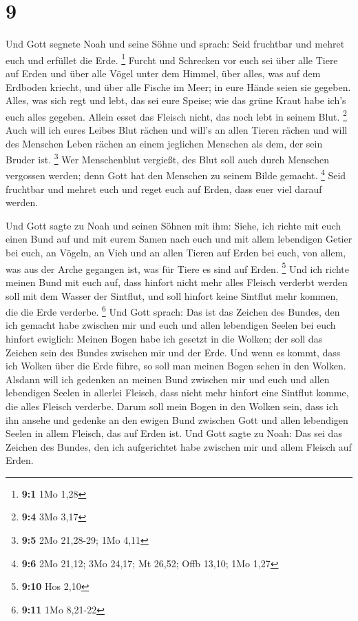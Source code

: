 \hypertarget{section-2}{%
\section{9}\label{section-2}}

 Und Gott segnete Noah und seine Söhne und sprach: Seid
fruchtbar und mehret euch und erfüllet die Erde. \footnote{\textbf{9:1}
  1Mo 1,28}  Furcht und Schrecken vor euch sei über alle
Tiere auf Erden und über alle Vögel unter dem Himmel, über alles, was
auf dem Erdboden kriecht, und über alle Fische im Meer; in eure Hände
seien sie gegeben.  Alles, was sich regt und lebt, das sei
eure Speise; wie das grüne Kraut habe ich's euch alles gegeben.
 Allein esset das Fleisch nicht, das noch lebt in seinem
Blut. \footnote{\textbf{9:4} 3Mo 3,17}  Auch will ich
eures Leibes Blut rächen und will's an allen Tieren rächen und will des
Menschen Leben rächen an einem jeglichen Menschen als dem, der sein
Bruder ist. \footnote{\textbf{9:5} 2Mo 21,28-29; 1Mo 4,11}
 Wer Menschenblut vergießt, des Blut soll auch durch
Menschen vergossen werden; denn Gott hat den Menschen zu seinem Bilde
gemacht. \footnote{\textbf{9:6} 2Mo 21,12; 3Mo 24,17; Mt 26,52; Offb
  13,10; 1Mo 1,27}  Seid fruchtbar und mehret euch und
reget euch auf Erden, dass euer viel darauf werden.

 Und Gott sagte zu Noah und seinen Söhnen mit ihm:
 Siehe, ich richte mit euch einen Bund auf und mit eurem
Samen nach euch  und mit allem lebendigen Getier bei
euch, an Vögeln, an Vieh und an allen Tieren auf Erden bei euch, von
allem, was aus der Arche gegangen ist, was für Tiere es sind auf Erden.
\footnote{\textbf{9:10} Hos 2,10}  Und ich richte meinen
Bund mit euch auf, dass hinfort nicht mehr alles Fleisch verderbt werden
soll mit dem Wasser der Sintflut, und soll hinfort keine Sintflut mehr
kommen, die die Erde verderbe. \footnote{\textbf{9:11} 1Mo 8,21-22}
 Und Gott sprach: Das ist das Zeichen des Bundes, den ich
gemacht habe zwischen mir und euch und allen lebendigen Seelen bei euch
hinfort ewiglich:  Meinen Bogen habe ich gesetzt in die
Wolken; der soll das Zeichen sein des Bundes zwischen mir und der Erde.
 Und wenn es kommt, dass ich Wolken über die Erde führe,
so soll man meinen Bogen sehen in den Wolken.  Alsdann
will ich gedenken an meinen Bund zwischen mir und euch und allen
lebendigen Seelen in allerlei Fleisch, dass nicht mehr hinfort eine
Sintflut komme, die alles Fleisch verderbe.  Darum soll
mein Bogen in den Wolken sein, dass ich ihn ansehe und gedenke an den
ewigen Bund zwischen Gott und allen lebendigen Seelen in allem Fleisch,
das auf Erden ist.  Und Gott sagte zu Noah: Das sei das
Zeichen des Bundes, den ich aufgerichtet habe zwischen mir und allem
Fleisch auf Erden.

